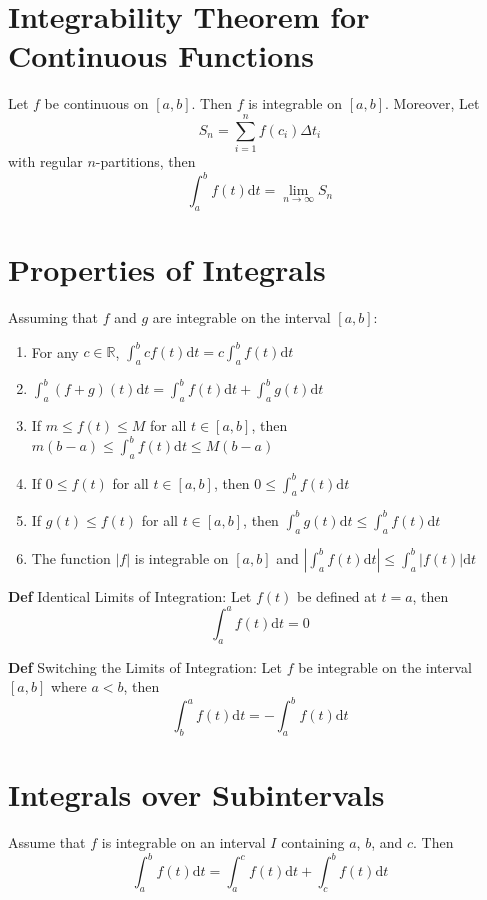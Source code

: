 \documentclass[11pt,notitlepage]{report}
\begin{document}
\section{Integrability Theorem for Continuous Functions}Let $f$ be continuous on $[a, b]$. Then $f$ is integrable on $[a, b]$. Moreover, Let $$S_n = \sum_{i = 1}^n f(c_i) \Delta t_i$$ with regular $n$-partitions, then $$\int_a^b f(t) \mathrm{d}t = \lim_{n \rightarrow \infty} S_n$$

\section{Properties of Integrals}Assuming that $f$ and $g$ are integrable on the interval $[a, b]$:
\begin{enumerate}[label=(\roman*)]
    \item For any $c \in \mathbb R$, $\int_a^b c f(t) \mathrm{d}t = c \int_a^b f(t) \mathrm{d}t$
    \item $\int_a^b (f+g)(t) \mathrm{d}t = \int_a^b f(t) \mathrm{d}t + \int_a^b g(t) \mathrm{d}t$
    \item If $m \leq f(t) \leq M$ for all $t \in [a, b]$, then $m(b-a) \leq \int_a^b f(t) \mathrm{d}t \leq M(b-a)$
    \item If $0 \leq f(t)$ for all $t \in [a, b]$, then $0 \leq \int_a^b f(t) \mathrm{d}t$
    \item If $g(t) \leq f(t)$ for all $t \in [a, b]$, then $\int_a^b g(t) \mathrm{d}t \leq \int_a^b f(t) \mathrm{d}t$
    \item The function $|f|$ is integrable on $[a, b]$ and $|\int_a^b f(t) \mathrm{d}t| \leq \int_a^b |f(t)| \mathrm{d}t$
\end{enumerate}


\textbf{Def} Identical Limits of Integration: Let $f(t)$ be defined at $t=a$, then
$$\int_a^a f(t) \mathrm{d}t = 0$$


\textbf{Def} Switching the Limits of Integration: Let $f$ be integrable on the interval $[a, b]$ where $a < b$, then
$$\int_b^a f(t) \mathrm{d}t = -\int_a^b f(t) \mathrm{d}t$$



\section{Integrals over Subintervals}Assume that $f$ is integrable on an interval $I$ containing $a$, $b$, and $c$. Then $$\int_a^b f(t) \mathrm{d}t = \int_a^c f(t) \mathrm{d}t + \int_c^b f(t) \mathrm{d}t$$
\end{document}
